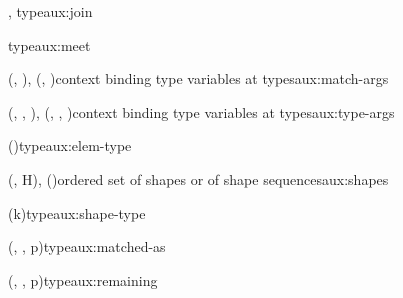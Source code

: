 \begin{auxfunction}{\joinTy{\Sigma}{\sigma}{\tau}, \bigJoinTy{\Sigma}{\seq{\tau}}}{type}{aux:join}

\end{auxfunction}

\begin{auxfunction}{\meetTy{\Sigma}{\sigma}{\tau}}{type}{aux:meet}

\end{auxfunction}

\begin{auxfunction}{\matchArgs(\tau, \sigma), \matchArgs(\seq{\tau}, \seq{\sigma})}{context binding type variables at types}{aux:match-args}

\end{auxfunction}

\begin{auxfunction}{\typeArgs{\Sigma}(\seq{\alpha}, \sigma, \tau), \typeArgs{\Sigma}(\seq{\alpha}, \seq{\sigma}, \seq{\tau})}{context binding type variables at types}{aux:type-args}

\vspace{-\baselineskip}
\end{auxfunction}

\begin{auxfunction}{\elemTy{\Sigma}(\tau)}{type}{aux:elem-type}

\end{auxfunction}

\begin{auxfunction}{\shapes{\Sigma}(\tau, H), \shapes{\Sigma}(\seq{\tau})}{ordered set of shapes or of shape sequences}{aux:shapes}

\end{auxfunction}

\begin{auxfunction}{\shapeTy(k)}{type}{aux:shape-type}

\end{auxfunction}

\begin{auxfunction}{\matchedAs{\Sigma}(\Gamma, \tau, p)}{type}{aux:matched-as}

\end{auxfunction}

\begin{auxfunction}{\remaining{\Sigma}(\Gamma, \tau, p)}{type}{aux:remaining}

\end{auxfunction}

